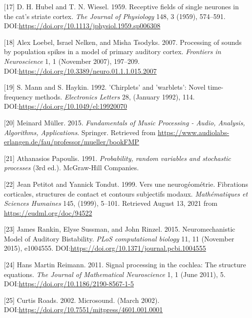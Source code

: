 \documentclass[american,]{article}
\theoremstyle{definition}
\theoremstyle{definition}
\theoremstyle{definition}
\theoremstyle{remark}
\begin{document}
\leavevmode\hypertarget{ref-hubel1959}{}%
{[}17{]} D. H. Hubel and T. N. Wiesel. 1959. Receptive fields of single neurones in the cat's striate cortex. \emph{The Journal of Physiology} 148, 3 (1959), 574--591. DOI:\url{https://doi.org/10.1113/jphysiol.1959.sp006308}

\leavevmode\hypertarget{ref-loebel2007}{}%
{[}18{]} Alex Loebel, Israel Nelken, and Misha Tsodyks. 2007. Processing of sounds by population spikes in a model of primary auditory cortex. \emph{Frontiers in Neuroscience} 1, 1 (November 2007), 197--209. DOI:\url{https://doi.org/10.3389/neuro.01.1.1.015.2007}

\leavevmode\hypertarget{ref-mann1992}{}%
{[}19{]} S. Mann and S. Haykin. 1992. 'Chirplets' and 'warblets': Novel time-frequency methods. \emph{Electronics Letters} 28, (January 1992), 114. DOI:\url{https://doi.org/10.1049/el:19920070}

\leavevmode\hypertarget{ref-muller2015}{}%
{[}20{]} Meinard Müller. 2015. \emph{Fundamentals of Music Processing - Audio, Analysis, Algorithms, Applications}. Springer. Retrieved from \url{https://www.audiolabs-erlangen.de/fau/professor/mueller/bookFMP}

\leavevmode\hypertarget{ref-papoulis1991}{}%
{[}21{]} Athanasios Papoulis. 1991. \emph{Probability, random variables and stochastic processes} (3rd ed.). McGraw-Hill Companies.

\leavevmode\hypertarget{ref-petitot1999}{}%
{[}22{]} Jean Petitot and Yannick Tondut. 1999. Vers une neurogéométrie. Fibrations corticales, structures de contact et contours subjectifs modaux. \emph{Mathématiques et Sciences Humaines} 145, (1999), 5--101. Retrieved August 13, 2021 from \url{https://eudml.org/doc/94522}

\leavevmode\hypertarget{ref-rankin2015}{}%
{[}23{]} James Rankin, Elyse Sussman, and John Rinzel. 2015. Neuromechanistic Model of Auditory Bistability. \emph{PLoS computational biology} 11, 11 (November 2015), e1004555. DOI:\url{https://doi.org/10.1371/journal.pcbi.1004555}

\leavevmode\hypertarget{ref-reimann2011}{}%
{[}24{]} Hans Martin Reimann. 2011. Signal processing in the cochlea: The structure equations. \emph{The Journal of Mathematical Neuroscience} 1, 1 (June 2011), 5. DOI:\url{https://doi.org/10.1186/2190-8567-1-5}

\leavevmode\hypertarget{ref-roads2002}{}%
{[}25{]} Curtis Roads. 2002. Microsound. (March 2002). DOI:\url{https://doi.org/10.7551/mitpress/4601.001.0001}
\end{document}
